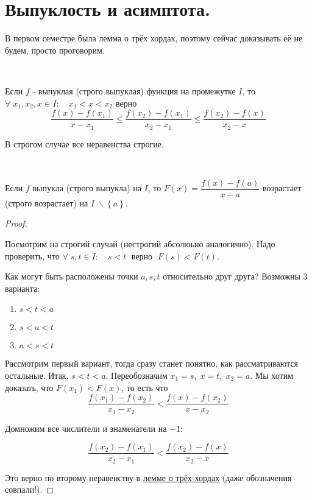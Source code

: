 \documentclass[../main.tex]{subfiles}
\begin{document}
\newpage
\section{Выпуклость и асимптота.}

В первом семестре была лемма о трёх хордах, поэтому сейчас доказывать её не будем, просто проговорим. 

\begin{thm}
    
    ~

    Если \( f\) - выпуклая (строго выпуклая) функция на промежутке \( I\), то \\
    \( \forall \; x_1, x_2, x \in I:\quad x_1<x<x_2\) верно
    \[ \dfrac{ f(x)-f(x_1)}{ x-x_1} \leq \dfrac{ f(x_2)-f(x_1)}{ x_2-x_1} \leq \dfrac{ f(x_2)-f(x)}{ x_2-x}\]

    В строгом случае все неравенства строгие. 
\end{thm}

\begin{crl}
        \hypertarget{thm:three_hord_crl}{~}
        Если \( f\) выпукла (строго выпукла) на \( I\), то \( F\left( x\right)= \dfrac{ f(x)-f(a)}{ x-a}\) возрастает (строго возрастает) на \( I \;\backslash \left\{ a\right\}\).
\end{crl}
\begin{proof}
    
    ~

    Посмотрим на строгий случай (нестрогий абсолюьно аналогично). Надо проверить, что \( \forall \; s,t \in I:\quad s<t\;\) верно \( \;F\left( s\right) < F\left( t\right)\). 

    Как могут быть расположены точки \( a,s,t\) относительно друг друга? Возможны 3 варианта:
    \begin{enumerate}
        \item \( s < t < a\)
        \item \( s < a < t\) 
        \item \( a < s < t\)
    \end{enumerate}

    Рассмотрим первый вариант, тогда сразу станет понятно, как рассматриваются остальные. Итак, 
    \( s < t < a\). Переобозначим \( x_1=s,\;x=t,\;x_2=a\). Мы хотим доказать, что \( F(x_1)<F(x)\), то есть что
    \[ \dfrac{ f(x_1)-f(x_2)}{ x_1-x_2}< \dfrac{ f(x)-f(x_2)}{ x-x_2}\]

    Домножим все числители и знаменатели на \( -1\):

    \[ \dfrac{ f(x_2)-f(x_1)}{ x_2-x_1}< \dfrac{ f(x_2)-f(x)}{ x_2-x}\]

    Это верно по второму неравенству в \hyperlink{thm:three_hord}{лемме о трёх хордах} (даже обозначения совпали!). 
\end{proof}
\end{document}
